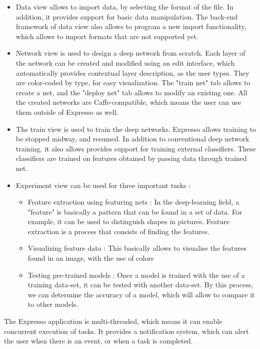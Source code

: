 \begin{itemize}
    \item Data view allows to import data, by selecting the format of the file. In addition, it provides support for basic data manipulation. The back-end framework of data view also allows to program a new import functionality, which allows to import formats that are not supported yet.
    \item Network view is used to design a deep network from scratch. Each layer of the network can be created and modified using an edit interface, which automatically provides contextual layer description, as the user types. They are color-coded by type, for easy visualization. The "train net" tab allows to create a net, and the "deploy net" tab allows to modify an existing one. All the created networks are Caffe-compatible, which means the user can use them outside of Expresso as well.
    \item The train view is used to train the deep networks. Expresso allows training to be stopped midway, and resumed. In addition to conventional deep network training, it also allows provides support for training external classifiers. These classifiers are trained on features obtained by passing data through trained net.
    \item Experiment view can be used for three important tasks :

    \begin{itemize}
        \item Feature extraction using featuring nets : In the deep-learning field, a "feature" is basically a pattern that can be found in a set of data. For example, it can be used to distinguish shapes in pictures. Feature extraction is a process that consists of finding the features.
        \item Visualizing feature data : This basically allows to visualise the features found in an image, with the use of colors
        \item Testing pre-trained models : Once a model is trained with the use of a training data-set, it can be tested with another data-set. By this process, we can determine the accuracy of a model, which will allow to compare it to other models.
    \end{itemize}
\end{itemize}
The Expresso application is multi-threaded, which means it can enable concurrent execution of tasks. It provides a notification system, which can alert the user when there is an event, or when a task is completed.

